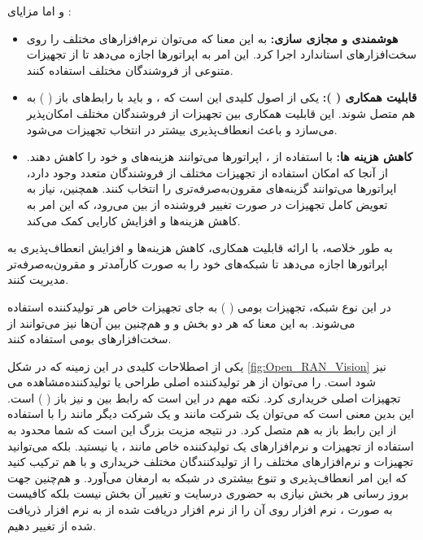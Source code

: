 \documentclass[landscape, 12pt]{report}
\begin{document}
	و اما مزایای 
	:
\begin{itemize}
\item \textbf{هوشمندی و مجازی سازی:}
به این معنا که می‌توان نرم‌افزارهای مختلف را روی سخت‌افزارهای استاندارد اجرا کرد. این امر به اپراتورها اجازه می‌دهد تا از تجهیزات متنوعی از فروشندگان مختلف استفاده کنند.
\item 
\textbf{قابلیت همکاری (
): }
یکی از اصول کلیدی 
 این است که
  ،
    و
      باید با رابط‌های باز
       (
       ) به هم متصل شوند. این قابلیت همکاری بین تجهیزات از فروشندگان مختلف امکان‌پذیر می‌سازد و باعث انعطاف‌پذیری بیشتر در انتخاب تجهیزات می‌شود.


\item \textbf{کاهش هزینه ها:} 
با استفاده از 
، اپراتورها می‌توانند هزینه‌های
  و
    خود را کاهش دهند. از آنجا که امکان استفاده از تجهیزات مختلف از فروشندگان متعدد وجود دارد، اپراتورها می‌توانند گزینه‌های مقرون‌به‌صرفه‌تری را انتخاب کنند. همچنین، نیاز به تعویض کامل تجهیزات در صورت تغییر فروشنده از بین می‌رود، که این امر به کاهش هزینه‌ها و افزایش کارایی کمک می‌کند.

\end{itemize}
	به طور خلاصه،
	 با ارائه قابلیت همکاری، کاهش هزینه‌ها و افزایش انعطاف‌پذیری به اپراتورها اجازه می‌دهد تا شبکه‌های خود را به صورت کارآمدتر و مقرون‌به‌صرفه‌تر مدیریت کنند.
	
	در این نوع شبکه، تجهیزات بومی (
	) به جای تجهیزات خاص هر تولیدکننده استفاده می‌شوند. به این معنا که هر دو بخش
 و
    و هم‌چنین
     بین آن‌ها نیز می‌توانند از سخت‌افزارهای بومی استفاده کنند.
	
	یکی از اصطلاحات کلیدی در این زمینه که در شکل \ref{fig:Open_RAN_Vision} نیز مشاهده می‎‌شود
	   است.
	     را می‌توان از هر تولیدکننده اصلی طراحی
	       یا تولیدکننده تجهیزات اصلی 
	 خریداری کرد. نکته مهم در 
	 این است که رابط بین
	   و
	     نیز باز (
	      ) است. این 
	بدین معنی است که می‌توان
	 یک شرکت مانند
	   و
	     یک شرکت دیگر مانند
	        را با استفاده از این رابط باز به هم متصل کرد. در نتیجه مزیت بزرگ 
	         این است که شما محدود به استفاده از تجهیزات و نرم‌افزارهای یک تولیدکننده خاص مانند
	          ، 
	          یا
	          نیستید. بلکه می‌توانید تجهیزات و نرم‌افزارهای مختلف را از تولیدکنندگان مختلف خریداری و با هم ترکیب کنید که این امر انعطاف‌پذیری و تنوع بیشتری در شبکه به ارمغان می‌آورد. و هم‌چنین جهت بروز رسانی هر بخش نیازی به حضوری درسایت و تغییر
	            آن بخش نیست بلکه کافیست به صورت
	              ، نرم افزار روی آن را از نرم افزار دریافت شده از
	                 به نرم افزار ذریافت شده از
	                    تغییر دهیم.
	
\end{document}
